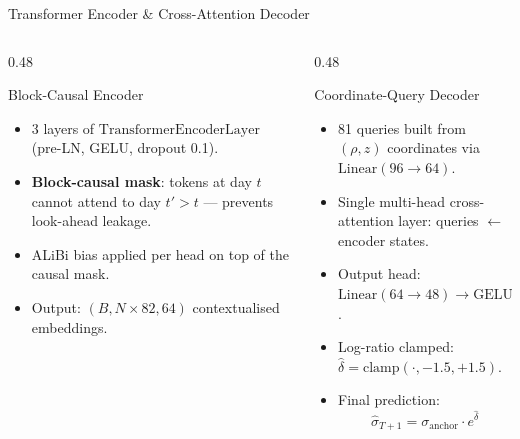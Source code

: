 \documentclass[aspectratio=169,10pt]{beamer}
\begin{document}
\begin{frame}{Transformer Encoder \& Cross-Attention Decoder}
  \begin{columns}[T]
    \begin{column}{0.48\textwidth}
      \begin{block}{Block-Causal Encoder}
        \footnotesize
        \begin{itemize}\itemsep3pt
          \item 3 layers of $\mathrm{TransformerEncoderLayer}$ (pre-LN, GELU, dropout 0.1).
          \item \textbf{Block-causal mask}: tokens at day $t$ cannot attend to day $t'>t$ --- prevents look-ahead leakage.
          \item ALiBi bias applied per head on top of the causal mask.
          \item Output: $(B,N\!\times\!82,64)$ contextualised embeddings.
        \end{itemize}
      \end{block}
    \end{column}
    \begin{column}{0.48\textwidth}
      \begin{block}{Coordinate-Query Decoder}
        \footnotesize
        \begin{itemize}\itemsep3pt
          \item 81 queries built from $(\rho,z)$ coordinates via $\mathrm{Linear}(96\to64)$.
          \item Single multi-head cross-attention layer: queries $\leftarrow$ encoder states.
          \item Output head: $\mathrm{Linear}(64\to48)\to\mathrm{GELU}\to\mathrm{Linear}(48\to1)$.
          \item Log-ratio clamped: $\hat{\delta}=\mathrm{clamp}(\cdot,-1.5,+1.5)$.
          \item Final prediction:
            \[
              \hat{\sigma}_{T+1}=\sigma_\text{anchor}\cdot e^{\hat{\delta}}
            \]
        \end{itemize}
      \end{block}
    \end{column}
  \end{columns}
\end{frame}
\end{document}

